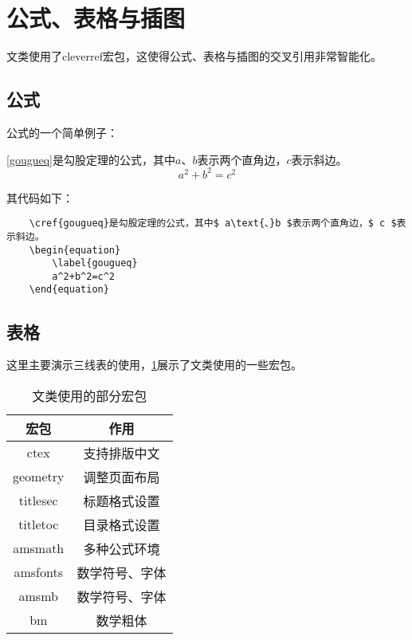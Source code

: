 \section{公式、表格与插图}
文类使用了cleverref宏包，这使得公式、表格与插图的交叉引用非常智能化。
\subsection{公式}
公式的一个简单例子：

\cref{gougueq}是勾股定理的公式，其中$ a\text{、}b $表示两个直角边，$ c $表示斜边。
\begin{equation}
	\label{gougueq}
	a^2+b^2=c^2
\end{equation}

其代码如下：
\begin{verbatim}
	\cref{gougueq}是勾股定理的公式，其中$ a\text{、}b $表示两个直角边，$ c $表示斜边。
	\begin{equation}
		\label{gougueq}
		a^2+b^2=c^2
	\end{equation}
\end{verbatim}
\subsection{表格}
这里主要演示三线表的使用，\cref{tab1}展示了文类使用的一些宏包。
\begin{table}[htbp]
	\centering
	\caption{文类使用的部分宏包}
	\label{tab1}
	\begin{tabular}{cc}
		\toprule[1.5pt]
		\hspace{1cm}宏包\hspace{1cm} & \hspace{3cm}作用\hspace{3cm} \\
		\midrule[0.75pt]
		ctex                         & 支持排版中文                 \\
		geometry                     & 调整页面布局                 \\
		titlesec                     & 标题格式设置                 \\
		titletoc                     & 目录格式设置                 \\
		amsmath                      & 多种公式环境                 \\
		amsfonts                     & 数学符号、字体               \\
		amsmb                        & 数学符号、字体               \\
		bm                           & 数学粗体                     \\
		\bottomrule[1.5pt]
	\end{tabular}
\end{table}


